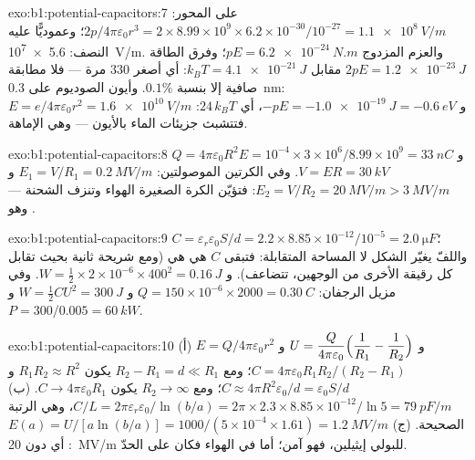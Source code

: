 \begin{solution}{exo:b1:potential-capacitors:7}
على المحور: $2p/4\pi\varepsilon_0r^3 = 2 \times 8.99 \times 10^9 \times 6.2 \times 10^{-30}/10^{-27} =
\qty{1.1e8}{V/m}$؛ وعموديًّا عليه النصف: \qty{5.6e7}{V/m}. والعزم المزدوج $pE =
\qty{6.2e-24}{N.m}$؛ وفرق الطاقة $2pE = \qty{1.2e-23}{J}$ مقابل $k_BT =
\qty{4.1e-21}{J}$: أي أصغر $330$ مرة --- فلا مطابقة صافية إلا بنسبة $0.1\%$.
وأيون الصوديوم على \qty{0.3}{nm}: $E = e/4\pi\varepsilon_0r^2 = \qty{1.6e10}{V/m}$ و $-pE
= \qty{-1.0e-19}{J} = \qty{-0.6}{eV}$، أي $24\,k_BT$: فتتشبث جزيئات الماء
بالأيون --- وهي الإماهة.
\end{solution}

\begin{solution}{exo:b1:potential-capacitors:8}
$Q = 4\pi\varepsilon_0R^2E = 10^{-4} \times 3 \times 10^6/8.99 \times 10^9 = \qty{33}{nC}$
و $V = ER = \qty{30}{kV}$. وفي الكرتين الموصولتين: $E_1 = V/R_1 = \qty{0.2}{MV/m}$
و $E_2 = V/R_2 = \qty{20}{MV/m} > \qty{3}{MV/m}$: فتؤيّن الكرة الصغيرة
الهواء وتنزف الشحنة --- وهو .
\end{solution}

\begin{solution}{exo:b1:potential-capacitors:9}
$C = \varepsilon_r\varepsilon_0S/d = 2.2 \times 8.85 \times 10^{-12}/10^{-5} = \qty{2.0}{\micro F}$؛
واللفّ يغيّر الشكل لا المساحة المتقابلة: فتبقى $C$ هي هي (ومع شريحة
ثانية بحيث تقابل كل رقيقة الأخرى من الوجهين، تتضاعف).
و $W = \tfrac12 \times 2 \times 10^{-6} \times 400^2 = \qty{0.16}{J}$. وفي مزيل الرجفان:
$Q = 150 \times 10^{-6} \times 2000 = \qty{0.30}{C}$ و $W = \tfrac12CU^2 = \qty{300}{J}$
و $P = 300/0.005 = \qty{60}{kW}$.
\end{solution}

\begin{solution}{exo:b1:potential-capacitors:10}
(أ) $E = Q/4\pi\varepsilon_0r^2$ و $U = \dfrac{Q}{4\pi\varepsilon_0}\Bigl(\dfrac1{R_1} -
\dfrac1{R_2}\Bigr)$ و $C = 4\pi\varepsilon_0R_1R_2/(R_2 - R_1)$؛ ومع $R_2 - R_1 = d \ll
R_1$ يكون $R_1R_2 \approx R^2$ و $C \approx 4\pi R^2\varepsilon_0/d = \varepsilon_0S/d$؛ ومع $R_2 \to
\infty$ يكون $C \to 4\pi\varepsilon_0R_1$. (ب) $C/L = 2\pi\varepsilon_r\varepsilon_0/\ln(b/a) = 2\pi \times 2.3
\times 8.85 \times 10^{-12}/\ln5 = \qty{79}{pF/m}$، وهي الرتبة الصحيحة. (ج) $E(a) =
U/[a\ln(b/a)] = 1000/(5 \times 10^{-4} \times 1.61) = \qty{1.2}{MV/m}$: أي دون
\qty{20}{MV/m} للبولي إيثيلين، فهو آمن؛ أما في الهواء فكان على الحدّ.
\end{solution}

